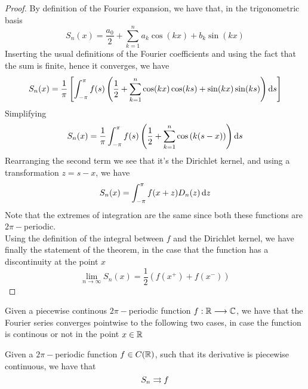 \documentclass[../complete.tex]{subfiles}
\begin{document}
\begin{proof}
	By definition of the Fourier expansion, we have that, in the trigonometric basis
	\begin{equation*}
		S_n(x)=\frac{a_0}{2}+\sum_{k=1}^{n}a_k\cos(kx)+b_k\sin(kx)
	\end{equation*}
	Inserting the usual definitions of the Fourier coefficients and using the fact that the sum is finite, hence it converges, we have
	\begin{equation*}
		S_n(x)=\frac{1}{\pi}\left[ \int_{-\pi}^{\pi}f(s)\left( \frac{1}{2}+\sum_{k=1}^{n}\cos(kx)\cos(ks)+\sin(kx)\sin(ks) \right)\operatorname{d\!} s \right]
	\end{equation*}
	Simplifying
	\begin{equation*}
		S_n(x)=\frac{1}{\pi}\int_{-\pi}^{\pi}f(s)\left( \frac{1}{2}+\sum_{k=1}^{n}\cos\left( k(s-x) \right) \right)\operatorname{d\!} s
	\end{equation*}
	Rearranging the second term we see that it's the Dirichlet kernel, and using a transformation $z=s-x$, we have
	\begin{equation*}
		S_n(x)=\int_{-\pi}^{\pi}f(x+z)D_n(z)\operatorname{d\!} z
	\end{equation*}
	Note that the extremes of integration are the same since both these functions are $2\pi-$periodic.\\
	Using the definition of the integral between $f$ and the Dirichlet kernel, we have finally the statement of the theorem, in the case that the function has a discontinuity at the point $x$
	\begin{equation*}
		\lim_{n\to\infty}S_n(x)=\frac{1}{2}\left( f(x^+)+f(x^-) \right)
	\end{equation*}
\end{proof}
\begin{thm}
	Given a piecewise continous $2\pi-$periodic function $f:\mathbb{R}\overset{}{\longrightarrow}\mathbb{C}$, we have that the Fourier series converges pointwise to the following two cases, in case the function is continous or not in the point $x\in\mathbb{R}$
\end{thm}
\begin{thm}
	Given a $2\pi-$periodic function $f\in C(\mathbb{R})$, such that its derivative is piecewise continuous, we have that
	\begin{equation*}
		S_n\rightrightarrows f
	\end{equation*}
\end{thm}
\end{document}
